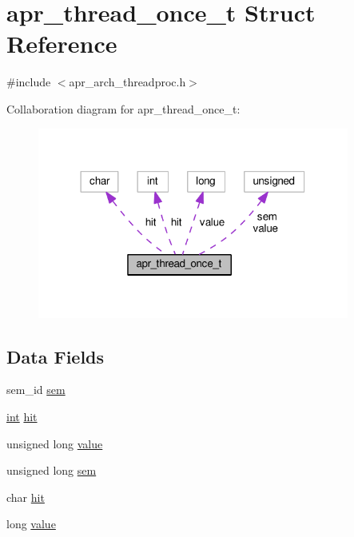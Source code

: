 \hypertarget{structapr__thread__once__t}{}\section{apr\+\_\+thread\+\_\+once\+\_\+t Struct Reference}
\label{structapr__thread__once__t}


{\ttfamily \#include $<$apr\+\_\+arch\+\_\+threadproc.\+h$>$}



Collaboration diagram for apr\+\_\+thread\+\_\+once\+\_\+t\+:
\nopagebreak
\begin{figure}[H]
\begin{center}
\leavevmode
\includegraphics[width=290pt]{structapr__thread__once__t__coll__graph}
\end{center}
\end{figure}
\subsection*{Data Fields}
\begin{DoxyCompactItemize}
\item 
sem\+\_\+id \hyperlink{structapr__thread__once__t_a80b936e6b09a6bf1982b04722dc7d0b8}{sem}
\item 
\hyperlink{pcre_8txt_a42dfa4ff673c82d8efe7144098fbc198}{int} \hyperlink{structapr__thread__once__t_ad9a780dfa21e9b99b2bf2f1a15d9bb20}{hit}
\item 
unsigned long \hyperlink{structapr__thread__once__t_a2e82419ef57c194d5755d931613a84f5}{value}
\item 
unsigned long \hyperlink{structapr__thread__once__t_a78826694bc3f7c2c67d0953bdee43b18}{sem}
\item 
char \hyperlink{structapr__thread__once__t_a370725fd6d5b1f0a0e40f9b138987a1e}{hit}
\item 
long \hyperlink{structapr__thread__once__t_a8f46eac53eac5140df3a44962507da69}{value}
\end{DoxyCompactItemize}


